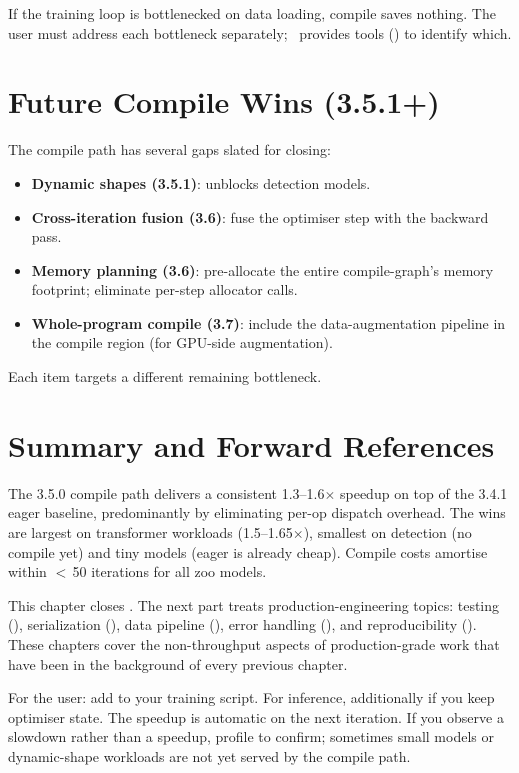 If the training loop is bottlenecked on data loading, compile
saves nothing. The user must address each bottleneck separately;
\Lucid\ provides tools () to
identify which.

\section{Future Compile Wins (3.5.1+)}
\label{sec:graph_capture_wins:future}

The compile path has several gaps slated for closing:

\begin{itemize}
  \item \textbf{Dynamic shapes (3.5.1)}: unblocks detection
    models.
  \item \textbf{Cross-iteration fusion (3.6)}: fuse the
    optimiser step with the backward pass.
  \item \textbf{Memory planning (3.6)}: pre-allocate the entire
    compile-graph's memory footprint; eliminate per-step
    allocator calls.
  \item \textbf{Whole-program compile (3.7)}: include the
    data-augmentation pipeline in the compile region (for
    GPU-side augmentation).
\end{itemize}

Each item targets a different remaining bottleneck.

\section{Summary and Forward References}
\label{sec:graph_capture_wins:summary}

The 3.5.0 compile path delivers a consistent 1.3--1.6$\times$
speedup on top of the 3.4.1 eager baseline, predominantly by
eliminating per-op dispatch overhead. The wins are largest on
transformer workloads (1.5--1.65$\times$), smallest on detection
(no compile yet) and tiny models (eager is already cheap).
Compile costs amortise within $<$\,50 iterations for all
zoo models.

This chapter closes . The next part
treats production-engineering topics: testing
(), serialization (),
data pipeline (), error handling
(), and reproducibility
(). These chapters cover the
non-throughput aspects of production-grade work that have been
in the background of every previous chapter.

\begin{lucidnote}
For the user: add  to your
training script. For inference, additionally
 if you keep optimiser state.
The speedup is automatic on the next iteration. If you observe
a slowdown rather than a speedup, profile to confirm; sometimes
small models or dynamic-shape workloads are not yet served by
the compile path.
\end{lucidnote}
